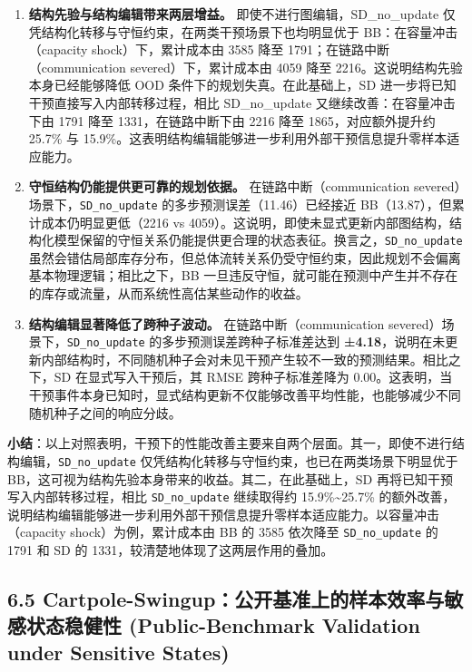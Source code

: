 \documentclass[UTF8]{ctexart}
\begin{document}
\begin{enumerate}
\item \textbf{结构先验与结构编辑带来两层增益。} 即使不进行图编辑，SD\_no\_update 仅凭结构化转移与守恒约束，在两类干预场景下也均明显优于 BB：在容量冲击（capacity shock）下，累计成本由 3585 降至 1791；在链路中断（communication severed）下，累计成本由 4059 降至 2216。这说明结构先验本身已经能够降低 OOD 条件下的规划失真。在此基础上，SD 进一步将已知干预直接写入内部转移过程，相比 SD\_no\_update 又继续改善：在容量冲击下由 1791 降至 1331，在链路中断下由 2216 降至 1865，对应额外提升约 25.7\% 与 15.9\%。这表明结构编辑能够进一步利用外部干预信息提升零样本适应能力。

\item \textbf{守恒结构仍能提供更可靠的规划依据。} 在链路中断（communication severed）场景下，\texttt{SD\_no\_update} 的多步预测误差（11.46）已经接近 BB（13.87），但累计成本仍明显更低（2216 vs 4059）。这说明，即使未显式更新内部图结构，结构化模型保留的守恒关系仍能提供更合理的状态表征。换言之，\texttt{SD\_no\_update} 虽然会错估局部库存分布，但总体流转关系仍受守恒约束，因此规划不会偏离基本物理逻辑；相比之下，BB 一旦违反守恒，就可能在预测中产生并不存在的库存或流量，从而系统性高估某些动作的收益。

\item \textbf{结构编辑显著降低了跨种子波动。} 在链路中断（communication severed）场景下，\texttt{SD\_no\_update} 的多步预测误差跨种子标准差达到 \textbf{±4.18}，说明在未更新内部结构时，不同随机种子会对未见干预产生较不一致的预测结果。相比之下，SD 在显式写入干预后，其 RMSE 跨种子标准差降为 0.00。这表明，当干预事件本身已知时，显式结构更新不仅能够改善平均性能，也能够减少不同随机种子之间的响应分歧。
\end{enumerate}

\textbf{小结}：以上对照表明，干预下的性能改善主要来自两个层面。其一，即使不进行结构编辑，\texttt{SD\_no\_update} 仅凭结构化转移与守恒约束，也已在两类场景下明显优于 BB，这可视为结构先验本身带来的收益。其二，在此基础上，SD 再将已知干预写入内部转移过程，相比 \texttt{SD\_no\_update} 继续取得约 15.9\%\textasciitilde{}25.7\% 的额外改善，说明结构编辑能够进一步利用外部干预信息提升零样本适应能力。以容量冲击（capacity shock）为例，累计成本由 BB 的 3585 依次降至 \texttt{SD\_no\_update} 的 1791 和 SD 的 1331，较清楚地体现了这两层作用的叠加。

\hypertarget{sub-cartpole-rescue}{%
\subsection{6.5 Cartpole-Swingup：公开基准上的样本效率与敏感状态稳健性 (Public-Benchmark Validation under Sensitive States)}\label{sub-cartpole-rescue}}
\end{document}
